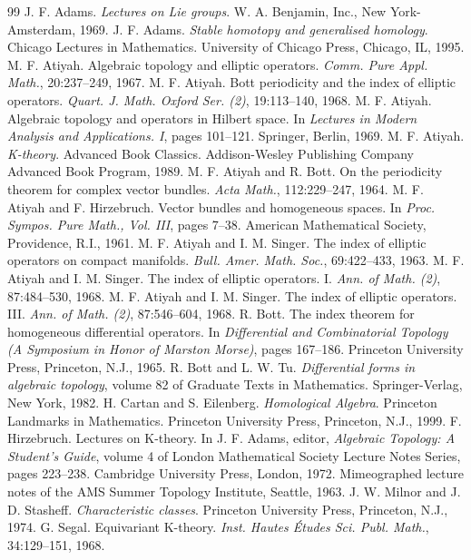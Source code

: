 
\begin{thebibliography}{99}
 J. F. Adams. \emph{Lectures on Lie groups}. W. A. Benjamin, Inc., New York-Amsterdam, 1969.
 J. F. Adams. \emph{Stable homotopy and generalised homology}. Chicago Lectures in Mathematics. University of Chicago Press, Chicago, IL, 1995.
 M. F. Atiyah. Algebraic topology and elliptic operators. \emph{Comm. Pure Appl. Math.}, 20:237--249, 1967.
 M. F. Atiyah. Bott periodicity and the index of elliptic operators. \emph{Quart. J. Math. Oxford Ser. (2)}, 19:113--140, 1968.
 M. F. Atiyah. Algebraic topology and operators in Hilbert space. In \emph{Lectures in Modern Analysis and Applications. I}, pages 101--121. Springer, Berlin, 1969.
 M. F. Atiyah. \emph{K-theory}. Advanced Book Classics. Addison-Wesley Publishing Company Advanced Book Program, 1989.
 M. F. Atiyah and R. Bott. On the periodicity theorem for complex vector bundles. \emph{Acta Math.}, 112:229--247, 1964.
 M. F. Atiyah and F. Hirzebruch. Vector bundles and homogeneous spaces. In \emph{Proc. Sympos. Pure Math., Vol. III}, pages 7--38. American Mathematical Society, Providence, R.I., 1961.
 M. F. Atiyah and I. M. Singer. The index of elliptic operators on compact manifolds. \emph{Bull. Amer. Math. Soc.}, 69:422--433, 1963.
 M. F. Atiyah and I. M. Singer. The index of elliptic operators. I. \emph{Ann. of Math. (2)}, 87:484--530, 1968.
 M. F. Atiyah and I. M. Singer. The index of elliptic operators. III. \emph{Ann. of Math. (2)}, 87:546--604, 1968.
 R. Bott. The index theorem for homogeneous differential operators. In \emph{Differential and Combinatorial Topology (A Symposium in Honor of Marston Morse)}, pages 167--186. Princeton University Press, Princeton, N.J., 1965.
 R. Bott and L. W. Tu. \emph{Differential forms in algebraic topology}, volume 82 of Graduate Texts in Mathematics. Springer-Verlag, New York, 1982.
 H. Cartan and S. Eilenberg. \emph{Homological Algebra}. Princeton Landmarks in Mathematics. Princeton University Press, Princeton, N.J., 1999.
 F. Hirzebruch. Lectures on K-theory. In J. F. Adams, editor, \emph{Algebraic Topology: A Student's Guide}, volume 4 of London Mathematical Society Lecture Notes Series, pages 223--238. Cambridge University Press, London, 1972. Mimeographed lecture notes of the AMS Summer Topology Institute, Seattle, 1963.
 J. W. Milnor and J. D. Stasheff. \emph{Characteristic classes}. Princeton University Press, Princeton, N.J., 1974.
 G. Segal. Equivariant K-theory. \emph{Inst. Hautes \'Etudes Sci. Publ. Math.}, 34:129--151, 1968.
\end{thebibliography}
